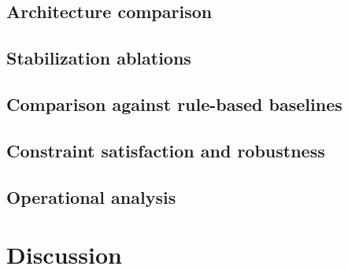\documentclass[preprint,12pt, 3p]{elsarticle}
\begin{document}
\subsection{Architecture comparison}
\label{subsec:res_arch}

\subsection{Stabilization ablations}
\label{subsec:res_ablation}

\subsection{Comparison against rule-based baselines}
\label{subsec:res_bounds}

\subsection{Constraint satisfaction and robustness}
\label{subsec:res_feasibility}

\subsection{Operational analysis}
\label{subsec:res_operation}





\section{Discussion}
\label{sec:discussion}
\end{document}
